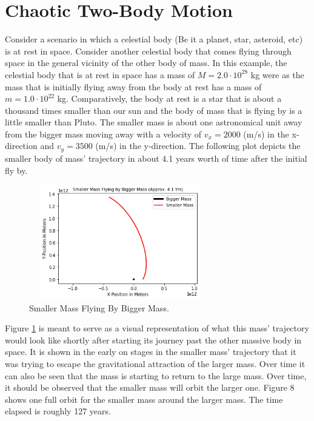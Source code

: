 \documentclass[twocolumn]{article}
\begin{document}
\section{Chaotic Two-Body Motion}
Consider a scenario in which a celestial body (Be it a planet, star, asteroid, etc) is at rest in space. Consider another celestial body that comes flying through space in the general vicinity of the other body of mass. In this example, the celestial body that is at rest in space has a mass of $M=2.0\cdot10^{28}$ kg were as the mass that is initially flying away from the body at rest has a mass of $m=1.0\cdot10^{22}$ kg. Comparatively, the body at rest is a star that is about a thousand times smaller than our sun and the body of mass that is flying by is a little smaller than Pluto. The smaller mass is about one astronomical unit away from the bigger mass moving away with a velocity of $v_{x}=2000$ (m/s) in the x-direction and $v_{y}=3500$ (m/s) in the y-direction. The following plot depicts the smaller body of mass' trajectory in about 4.1 years worth of time after the initial fly by.
\begin{figure}[h]
    \centering
    \includegraphics[width=8cm, height=5cm]{Figures/2-Body Fly By (1).png}
    \caption{\small{Smaller Mass Flying By Bigger Mass.}}
    \label{Fig. 2 Body Fly By Fig. 1}
\end{figure}
\par \noindent
Figure \ref{Fig. 2 Body Fly By Fig. 1} is meant to serve as a visual representation of what this mass' trajectory would look like shortly after starting its journey past the other massive body in space. It is shown in the early on stages in the smaller mass' trajectory that it was trying to escape the gravitational attraction of the larger mass. Over time it can also be seen that the mass is starting to return to the large mass. Over time, it should be observed that the smaller mass will orbit the larger one. Figure 8 shows one full orbit for the smaller mass around the larger mass. The time elapsed is roughly 127 years.
\end{document}
